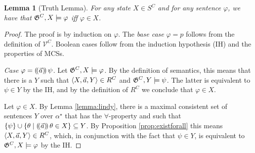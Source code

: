 \documentclass{article}
\newtheorem{lemma}{Lemma}
\begin{document}
\begin{lemma}[Truth Lemma] 
\label{lemma:truth}
For any state $X \in S^C$ %
and for any sentence $\varphi$, we have that $\mathfrak{G}^C, X \models \varphi$ iff $\varphi \in X$.  
\end{lemma}
\begin{proof}

    The proof is by induction on $\varphi$. The \textit{base case} $\varphi = p$ %
   follows from the definition of $\mathcal{V}^C$. %
    Boolean cases follow from the induction hypothesis (IH) and the properties of MCSs.

\textit{Case} $\varphi = (\!( \vec{a} )\!)\, \psi$. %
Let $\mathfrak{G}^C,X\models \varphi$. By the definition of semantics, this means that there is a $Y$ such that $\langle X,\vec{a},Y \rangle\in R^C$ and $\mathfrak{G}^C,Y\models \psi$. The latter is equivalent to $\psi\in Y$ by the IH, and by the definition of $R^C$ we conclude that $\varphi\in X$.

Let $\varphi \in X$. By Lemma \ref{lemma:lindy}, there is a maximal consistent set of sentences $Y$ over $\alpha^\star$ that has the $\forall$-property and such that $\{\psi\}\cup\{\theta\mid (\!( \vec{a} )\!)\,\theta\in X\}\subseteq Y$. By Proposition \ref{prop:existforall} this means $\langle X,\vec{a},Y \rangle\in R^C$, which, in conjunction with the fact that $\psi \in Y$, is equivalent to $\mathfrak{G}^C,X \models \varphi$ by the IH.


\end{proof}
\end{document}

